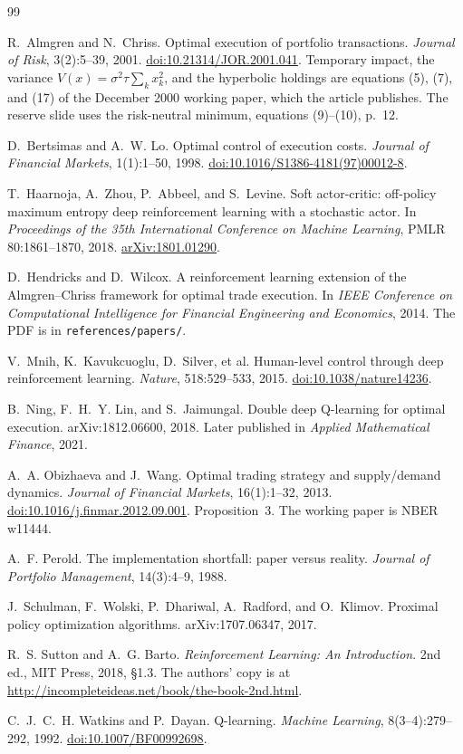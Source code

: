 \documentclass[11pt]{article}
\begin{document}
\begin{thebibliography}{99}

R.~Almgren and N.~Chriss.
Optimal execution of portfolio transactions.
\emph{Journal of Risk}, 3(2):5--39, 2001.
\href{https://doi.org/10.21314/JOR.2001.041}{doi:10.21314/JOR.2001.041}.
Temporary impact, the variance \(V(x)=\sigma^{2}\tau\sum_k x_k^{2}\), and the hyperbolic holdings are equations (5), (7), and (17) of the December 2000 working paper, which the article publishes. The reserve slide uses the risk-neutral minimum, equations (9)--(10), p.~12.

D.~Bertsimas and A.~W. Lo.
Optimal control of execution costs.
\emph{Journal of Financial Markets}, 1(1):1--50, 1998.
\href{https://doi.org/10.1016/S1386-4181(97)00012-8}{doi:10.1016/S1386-4181(97)00012-8}.

T.~Haarnoja, A.~Zhou, P.~Abbeel, and S.~Levine.
Soft actor-critic: off-policy maximum entropy deep reinforcement learning with a stochastic actor.
In \emph{Proceedings of the 35th International Conference on Machine Learning}, PMLR 80:1861--1870, 2018.
\href{https://arxiv.org/abs/1801.01290}{arXiv:1801.01290}.

D.~Hendricks and D.~Wilcox.
A reinforcement learning extension of the Almgren--Chriss framework for optimal trade execution.
In \emph{IEEE Conference on Computational Intelligence for Financial Engineering and Economics}, 2014.
The PDF is in \texttt{references/papers/}.

V.~Mnih, K.~Kavukcuoglu, D.~Silver, et al.
Human-level control through deep reinforcement learning.
\emph{Nature}, 518:529--533, 2015.
\href{https://doi.org/10.1038/nature14236}{doi:10.1038/nature14236}.

B.~Ning, F.~H.~Y. Lin, and S.~Jaimungal.
Double deep Q-learning for optimal execution.
arXiv:1812.06600, 2018.
Later published in \emph{Applied Mathematical Finance}, 2021.

A.~A. Obizhaeva and J.~Wang.
Optimal trading strategy and supply/demand dynamics.
\emph{Journal of Financial Markets}, 16(1):1--32, 2013.
\href{https://doi.org/10.1016/j.finmar.2012.09.001}{doi:10.1016/j.finmar.2012.09.001}.
Proposition~3. The working paper is NBER w11444.

A.~F. Perold.
The implementation shortfall: paper versus reality.
\emph{Journal of Portfolio Management}, 14(3):4--9, 1988.

J.~Schulman, F.~Wolski, P.~Dhariwal, A.~Radford, and O.~Klimov.
Proximal policy optimization algorithms.
arXiv:1707.06347, 2017.

R.~S. Sutton and A.~G. Barto.
\emph{Reinforcement Learning: An Introduction}.
2nd ed., MIT Press, 2018, \S 1.3.
The authors' copy is at \url{http://incompleteideas.net/book/the-book-2nd.html}.

C.~J.~C.~H. Watkins and P.~Dayan.
Q-learning.
\emph{Machine Learning}, 8(3--4):279--292, 1992.
\href{https://doi.org/10.1007/BF00992698}{doi:10.1007/BF00992698}.

\end{thebibliography}
\end{document}
